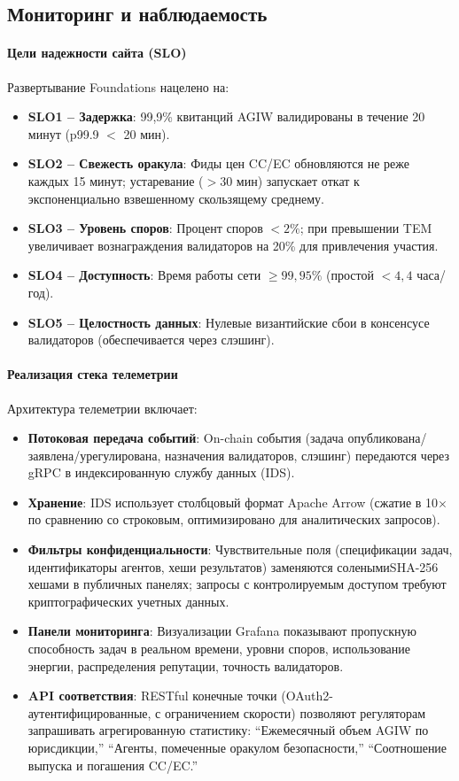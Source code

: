 \documentclass[11pt]{article}
\begin{document}
\subsection{Мониторинг и наблюдаемость}
\paragraph{Цели надежности сайта (SLO)} Развертывание Foundations нацелено на:
\begin{itemize}[noitemsep]
  \item \textbf{SLO1 -- Задержка}: 99,9\% квитанций AGIW валидированы в течение 20 минут (p99.9 $<$ 20 мин).
  \item \textbf{SLO2 -- Свежесть оракула}: Фиды цен CC/EC обновляются не реже каждых 15 минут; устаревание ($>30$ мин) запускает откат к экспоненциально взвешенному скользящему среднему.
  \item \textbf{SLO3 -- Уровень споров}: Процент споров $<2\%$; при превышении TEM увеличивает вознаграждения валидаторов на 20\% для привлечения участия.
  \item \textbf{SLO4 -- Доступность}: Время работы сети $\geq 99,95\%$ (простой $<4,4$ часа/год).
  \item \textbf{SLO5 -- Целостность данных}: Нулевые византийские сбои в консенсусе валидаторов (обеспечивается через слэшинг).
\end{itemize}

\paragraph{Реализация стека телеметрии} Архитектура телеметрии включает:
\begin{itemize}[noitemsep]
  \item \textbf{Потоковая передача событий}: On-chain события (задача опубликована/заявлена/урегулирована, назначения валидаторов, слэшинг) передаются через gRPC в индексированную службу данных (IDS).
  \item \textbf{Хранение}: IDS использует столбцовый формат Apache Arrow (сжатие в 10$\times$ по сравнению со строковым, оптимизировано для аналитических запросов).
  \item \textbf{Фильтры конфиденциальности}: Чувствительные поля (спецификации задач, идентификаторы агентов, хеши результатов) заменяются соленымиSHA-256 хешами в публичных панелях; запросы с контролируемым доступом требуют криптографических учетных данных.
  \item \textbf{Панели мониторинга}: Визуализации Grafana показывают пропускную способность задач в реальном времени, уровни споров, использование энергии, распределения репутации, точность валидаторов.
  \item \textbf{API соответствия}: RESTful конечные точки (OAuth2-аутентифицированные, с ограничением скорости) позволяют регуляторам запрашивать агрегированную статистику: ``Ежемесячный объем AGIW по юрисдикции,'' ``Агенты, помеченные оракулом безопасности,'' ``Соотношение выпуска и погашения CC/EC.''
\end{itemize}
\end{document}
